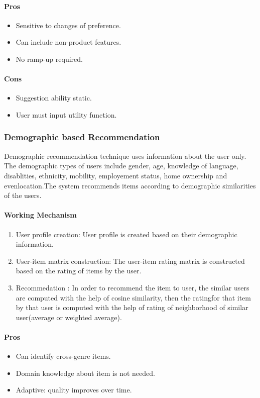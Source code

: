 \paragraph{Pros}\hfill

\begin{itemize}
	\item Sensitive to changes of preference.
	\item Can include non-product features.
	\item No ramp-up required.
\end{itemize}
\paragraph{Cons}\hfill

\begin{itemize}
	\item Suggestion ability static.
	\item User must input utility function.
\end{itemize}

\subsubsection{Demographic based Recommendation}
Demographic recommendation technique \cite{demographic} uses information about the user only. The demographic types of users include gender, age, knowledge of language, disablities, ethnicity, mobility, employement status, home  ownership and evenlocation.The system recommends items according to demographic similarities of the users.
\paragraph{Working Mechanism}\hfill
\begin{enumerate}
	\item User profile creation: User profile is created based on their demographic information.
	\item User-item matrix construction: The user-item rating matrix is constructed based on the rating of items by the user.
	\item Recommedation : In order to recommend the item to user, the similar users are computed with the help of cosine similarity, then the ratingfor that item by that user is computed with the help of rating of neighborhood of similar user(average or weighted average).
\end{enumerate}
\paragraph{Pros}\hfill
\begin{itemize}
	\item Can identify cross-genre items.
	\item Domain knowledge about item is not needed.
	\item Adaptive: quality improves over time.
\end{itemize}
